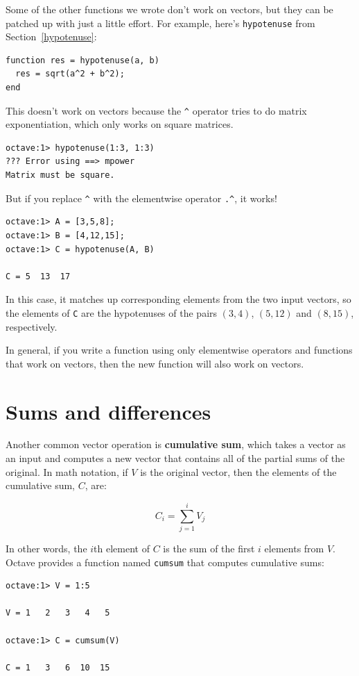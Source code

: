 \documentclass{book}
\begin{document}
Some of the other functions we wrote don't work on vectors,
but they can be patched up with just a little effort. For example,
here's {\tt hypotenuse} from Section~\ref{hypotenuse}:

\begin{verbatim}
function res = hypotenuse(a, b)
  res = sqrt(a^2 + b^2);
end
\end{verbatim}

This doesn't work on vectors because the \verb+^+ operator
tries to do matrix exponentiation, which only works on
square matrices.

\begin{verbatim}
octave:1> hypotenuse(1:3, 1:3)
??? Error using ==> mpower
Matrix must be square.
\end{verbatim}

But if you replace \verb+^+ with the elementwise operator
\verb+.^+, it works!

\begin{verbatim}
octave:1> A = [3,5,8];
octave:1> B = [4,12,15];
octave:1> C = hypotenuse(A, B)

C = 5  13  17
\end{verbatim}
 
In this case, it matches up corresponding elements from the two
input vectors, so the elements of {\tt C} are the hypotenuses of
the pairs $(3,4)$, $(5,12)$ and $(8,15)$, respectively.

In general, if you write a function using only elementwise
operators and functions that work on vectors, then the new
function will also work on vectors.


\section{Sums and differences}

Another common vector operation is {\bf cumulative sum}, which takes a
vector as an input and computes a new vector that contains all of the
partial sums of the original. In math notation, if $V$ is the
original vector, then the elements of the cumulative sum, $C$, are:

\[ C_i = \sum_{j=1}^i V_j \]

In other words, the $i$th element of $C$ is the sum of the first
$i$ elements from $V$. Octave provides a function named {\tt cumsum}
that computes cumulative sums:

\begin{verbatim}
octave:1> V = 1:5

V = 1   2   3   4   5

octave:1> C = cumsum(V)

C = 1   3   6  10  15
\end{verbatim}
\end{document}

